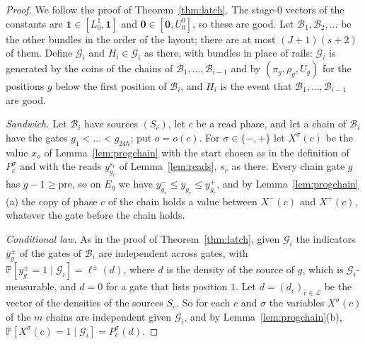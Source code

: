 \documentclass[11pt]{amsart}
\theoremstyle{definition}
\theoremstyle{remark}
\newcommand{\PP}{\mathbb{P}}
\begin{document}
\begin{proof}
We follow the proof of Theorem~\ref{thm:latch}. The stage-$0$ vectors of the constants are
$\mathbf 1\in[L^1_0,\mathbf 1]$ and $\mathbf 0\in[\mathbf 0,U^0_0]$, so these are good. Let
$\mathcal B_1,\mathcal B_2,\dots$ be the other bundles in the order of the layout; there are at
most $(J+1)(s+2)$ of them. Define $\mathcal G_i$ and $H_i\in\mathcal G_i$ as there, with bundles in
place of rails: $\mathcal G_i$ is generated by the coins of the chains of
$\mathcal B_1,\dots,\mathcal B_{i-1}$ and by $(\pi_g,\rho_g,U_g)$ for the positions $g$ below the
first position of $\mathcal B_i$, and $H_i$ is the event that $\mathcal B_1,\dots,\mathcal B_{i-1}$
are good.

\emph{Sandwich.} Let $\mathcal B_i$ have sources $(S_c)$, let $c$ be a read phase, and let a chain
of $\mathcal B_i$ have the gates $g_1<\dots<g_{24h}$; put $o=o(c)$. For $\sigma\in\{-,+\}$ let
$X^\sigma(c)$ be the value $x_o$ of Lemma~\ref{lem:progchain} with the start chosen as in the
definition of $P^\sigma_c$ and with the reads $y^{s_r}_{g_r}$ of Lemma~\ref{lem:reads}, $s_r$ as
there. Every chain gate $g$ has $g-1\ge\mathrm{pre}$, so on $E_\eta$ we have
$y^-_{g_r}\le y_{g_r}\le y^+_{g_r}$, and by Lemma~\ref{lem:progchain}(a) the copy of phase $c$ of
the chain holds a value between $X^-(c)$ and $X^+(c)$, whatever the gate before the chain holds.

\emph{Conditional law.} As in the proof of Theorem~\ref{thm:latch}, given $\mathcal G_i$ the
indicators $y^\pm_g$ of the gates of $\mathcal B_i$ are independent across gates, with
$\PP[y^\pm_g=1\mid\mathcal G_i]=\ell^\pm(d)$, where $d$ is the density of the source of $g$, which is
$\mathcal G_i$-measurable, and $d=0$ for a gate that lists position $1$. Let $d=(d_c)_{c\in\mathcal L}$
be the vector of the densities of the sources $S_c$. So for each $c$ and $\sigma$ the variables
$X^\sigma(c)$ of the $m$ chains are independent given $\mathcal G_i$, and by
Lemma~\ref{lem:progchain}(b), $\PP[X^\sigma(c)=1\mid\mathcal G_i]=P^\sigma_c(d)$.


\end{proof}
\end{document}
